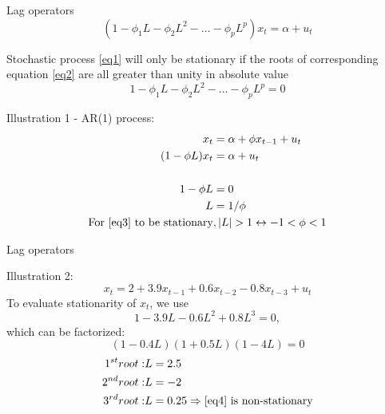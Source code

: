 \documentclass{beamer}
\begin{document}
\begin{frame}{Lag operators}
\vspace{-0.5cm}
\begin{equation} \label{eq1}
(1-\phi_1 L - \phi_2 L^2 - \dots - \phi_p L^p)x_t = \alpha + u_t
\end{equation}

Stochastic process \eqref{eq1} will only be stationary if the roots of corresponding equation \eqref{eq2}  are all greater than unity in absolute value 
\vspace{-0.5cm}
\begin{equation} \label{eq2}
1-\phi_1 L - \phi_2 L^2 - \dots - \phi_p L^p = 0
\end{equation}
\vspace{-0.5cm}
\begin{block}{Illustration 1 - AR(1) process:}
\vspace{-0.5cm}
\begin{align}
\vspace{-0.5cm}
x_t & =  \alpha + \phi x_{t-1} + u_t \label{eq3}  \\ \nonumber
(1-\phi L) x_t & =  \alpha + u_t\\ \nonumber
~ \\ \nonumber
1- \phi L & = 0 \\ \nonumber
L & = 1/\phi \\ \nonumber
\textnormal{For \eqref{eq3} to be stationary} &, \textnormal{$|L|>1 \leftrightarrow -1 < \phi < 1$}
\end{align}
\end{block}

\end{frame}


\begin{frame}{Lag operators}
\begin{block}{Illustration 2:}
\begin{equation}
x_t   = 2 + 3.9 x_{t-1} + 0.6 x_{t-2} - 0.8 x_{t-3} + u_t \label{eq4}
\end{equation}
To evaluate stationarity of $x_t$, we use
\begin{equation*}
1-3.9 L - 0.6 L^2 + 0.8 L^3  = 0 , 
\end{equation*}
which can be factorized:
$$ (1-0.4L)(1+0.5L)(1-4L) =0 $$
\vspace{-0.5cm}
\begin{align} \notag
1^{st} root: & L = 2.5 \\ \notag
2^{nd} root: & L =-2 \\ \notag
3^{rd} root: & L = 0.25 \Rightarrow \textnormal{\eqref{eq4}  is non-stationary}
\end{align}
\end{block}
\end{frame}
\end{document}
